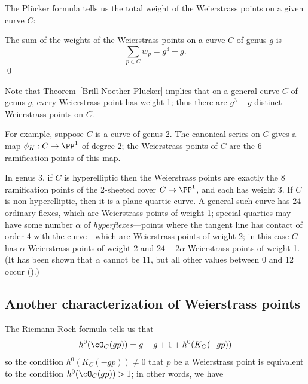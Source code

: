 The Pl\"ucker formula tells us  the total weight of the Weierstrass points on a given curve $C$:

\begin{corollary}\label{plucker formula}
The sum of the weights of the Weierstrass points on a curve $C$ of genus $g$ is
$$
\sum_{p \in C} w_p = g^3-g.
$$\qed
\end{corollary}

Note that Theorem~\ref{Brill Noether Plucker} implies that on a general curve $C$ of genus $g$, every Weierstrass point has weight 1; thus there are $g^3-g$ distinct Weierstrass points on $C$.


For example, suppose $C$ is a curve of genus 2. The canonical series on $C$ gives a map $\phi_K : C \to \PP^1$ of degree 2; the Weierstrass points of $C$ are the 6 ramification points of this map. 

In genus 3, if $C$ is hyperelliptic then the Weierstrass points are exactly the 8 ramification points of the 2-sheeted cover $C \to \PP^1$, and each has weight 3. If $C$ is non-hyperelliptic, then it is a plane quartic curve. A general such curve has 24 ordinary flexes, which are Weierstrass points of weight 1; special quartics may have some number $\alpha$ of \emph{hyperflexes}---points where the tangent line has contact of order 4 with the curve---which are Weierstrass points of weight 2; in this case $C$ has $\alpha$ Weierstrass points of weight 2 and $24-2\alpha$ Weierstrass points of weight 1. (It has been shown that $\alpha$ cannot be 11, but  all  other values  between 0 and 12 occur (\cite{Vermeulen}).)

\subsection{Another characterization of Weierstrass points}

The Riemann-Roch formula tells us that
$$
h^0(\cO_C(gp)) = g - g + 1 + h^0(K_C(-gp))
$$
so the condition $h^0(K_C(-gp)) \neq 0$ that $p$ be a Weierstrass point is equivalent to the condition $h^0(\cO_C(gp)) > 1$; in other words, we have

